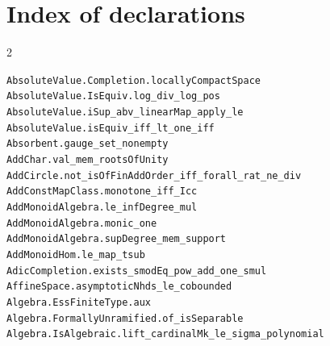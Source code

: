 \documentclass[10pt,a4paper]{article}
\begin{document}
\section*{Index of declarations}
\begin{multicols}{2}\footnotesize\raggedright
\texttt{AbsoluteValue.\allowbreak{}Completion.\allowbreak{}locallyCompactSpace} \\
\texttt{AbsoluteValue.\allowbreak{}IsEquiv.\allowbreak{}log\_div\_log\_pos} \\
\texttt{AbsoluteValue.\allowbreak{}iSup\_abv\_linearMap\_apply\_le} \\
\texttt{AbsoluteValue.\allowbreak{}isEquiv\_iff\_lt\_one\_iff} \\
\texttt{Absorbent.\allowbreak{}gauge\_set\_nonempty} \\
\texttt{AddChar.\allowbreak{}val\_mem\_rootsOfUnity} \\
\texttt{AddCircle.\allowbreak{}not\_isOfFinAddOrder\_iff\_forall\_rat\_ne\_div} \\
\texttt{AddConstMapClass.\allowbreak{}monotone\_iff\_Icc} \\
\texttt{AddMonoidAlgebra.\allowbreak{}le\_infDegree\_mul} \\
\texttt{AddMonoidAlgebra.\allowbreak{}monic\_one} \\
\texttt{AddMonoidAlgebra.\allowbreak{}supDegree\_mem\_support} \\
\texttt{AddMonoidHom.\allowbreak{}le\_map\_tsub} \\
\texttt{AdicCompletion.\allowbreak{}exists\_smodEq\_pow\_add\_one\_smul} \\
\texttt{AffineSpace.\allowbreak{}asymptoticNhds\_le\_cobounded} \\
\texttt{Algebra.\allowbreak{}EssFiniteType.\allowbreak{}aux} \\
\texttt{Algebra.\allowbreak{}FormallyUnramified.\allowbreak{}of\_isSeparable} \\
\texttt{Algebra.\allowbreak{}IsAlgebraic.\allowbreak{}lift\_cardinalMk\_le\_sigma\_polynomial} \\

\end{multicols}
\end{document}
